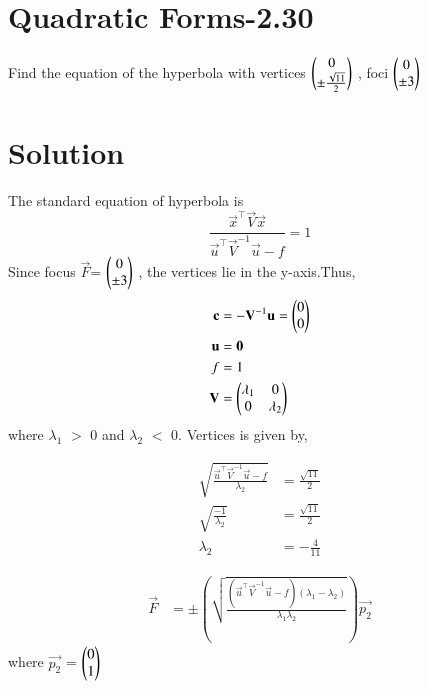 \documentclass[journal,12pt,twocolumn]{IEEEtran}
\begin{document}
\section{Quadratic Forms-2.30}
Find the equation of the hyperbola with vertices
$\begin{pmatrix}0\\ \pm \frac{\sqrt{11}}{2}\end{pmatrix}$ , foci $\begin{pmatrix}0\\ \pm 3\end{pmatrix}$

\section{Solution}
The standard equation of hyperbola is
\begin{equation}
    \frac{\vec{x}^{\top}\vec{V}\vec{x}}{\vec{u}^{\top}\vec{V}^{-1}\vec{u}-f} = 1
\end{equation}
Since focus $\vec{F}$= $\begin{pmatrix}0\\ \pm 3\end{pmatrix}$ , the vertices lie in the y-axis.Thus,
\begin{align}
    \mathbf{c} &= -\mathbf{V}^{-1}\mathbf{u} = \begin{pmatrix}0\\0\end{pmatrix} \\
    \mathbf{u} &= \mathbf{0}\\
    f &= 1\\
    \mathbf{V} &= \begin{pmatrix}\lambda_1 & 0 \\ 0 & \lambda_2\end{pmatrix}
\end{align}
where $\lambda_1$ $>$ 0 and $\lambda_2$ $<$ 0.
Vertices is given by,

\begin{align}
    \sqrt{\frac{\vec{u}^{\top}\vec{V}^{-1}\vec{u}-f}{\lambda_2}} &= \frac{\sqrt{11}}{2}\\
    \sqrt{\frac{-1}{\lambda_2}} &= \frac{\sqrt{11}}{2}\\
    \lambda_2 &= -\frac{4}{11}
\end{align}

\begin{align}
    \vec{F} &= \pm \left(\sqrt{\frac{(\vec{u}^{\top}\vec{V}^{-1}\vec{u}-f)(\lambda_1-\lambda_2)}{\lambda_1 \lambda_2}}\right) \vec{p_2}
\end{align}
where $\vec{p_2}$ = $\begin{pmatrix}0\\1\end{pmatrix}$
\end{document}
